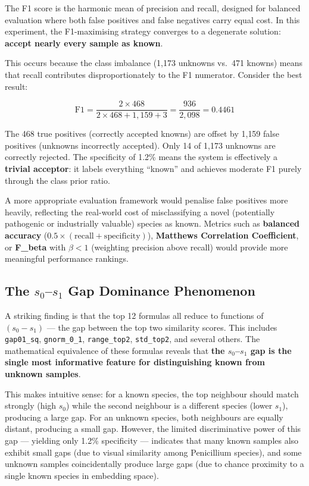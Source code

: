 \documentclass[11pt,a4paper]{article}
\newcommand{\formula}[1]{\texttt{#1}}
\begin{document}
The F1 score is the harmonic mean of precision and recall, designed for balanced evaluation where both false positives and false negatives carry equal cost. In this experiment, the F1-maximising strategy converges to a degenerate solution: \textbf{accept nearly every sample as known}.

This occurs because the class imbalance (1{,}173 unknowns vs.\ 471 knowns) means that recall contributes disproportionately to the F1 numerator. Consider the best result:

\[
\text{F1} = \frac{2 \times 468}{2 \times 468 + 1{,}159 + 3} = \frac{936}{2{,}098} = 0.4461
\]

\noindent The 468 true positives (correctly accepted knowns) are offset by 1{,}159 false positives (unknowns incorrectly accepted). Only 14 of 1{,}173 unknowns are correctly rejected. The specificity of 1.2\% means the system is effectively a \textbf{trivial acceptor}: it labels everything ``known'' and achieves moderate F1 purely through the class prior ratio.

A more appropriate evaluation framework would penalise false positives more heavily, reflecting the real-world cost of misclassifying a novel (potentially pathogenic or industrially valuable) species as known. Metrics such as \textbf{balanced accuracy} ($0.5 \times (\text{recall} + \text{specificity})$), \textbf{Matthews Correlation Coefficient}, or \textbf{F\_beta} with $\beta < 1$ (weighting precision above recall) would provide more meaningful performance rankings.

\subsection{The \texorpdfstring{$s_0$--$s_1$}{s0-s1} Gap Dominance Phenomenon}

A striking finding is that the top 12 formulas all reduce to functions of $(s_0 - s_1)$ --- the gap between the top two similarity scores. This includes \formula{gap01\_sq}, \formula{gnorm\_0\_1}, \formula{range\_top2}, \formula{std\_top2}, and several others. The mathematical equivalence of these formulas reveals that \textbf{the $s_0$--$s_1$ gap is the single most informative feature for distinguishing known from unknown samples}.

This makes intuitive sense: for a known species, the top neighbour should match strongly (high $s_0$) while the second neighbour is a different species (lower $s_1$), producing a large gap. For an unknown species, both neighbours are equally distant, producing a small gap. However, the limited discriminative power of this gap --- yielding only 1.2\% specificity --- indicates that many known samples also exhibit small gaps (due to visual similarity among Penicillium species), and some unknown samples coincidentally produce large gaps (due to chance proximity to a single known species in embedding space).
\end{document}
